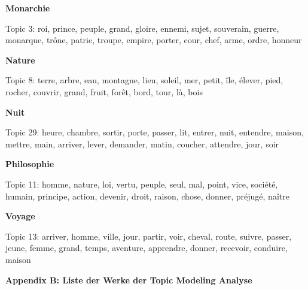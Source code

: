 \documentclass[
  12pt,
  letterpaper,
  DIV=11,
  numbers=noendperiod]{scrreprt}
\begin{document}
\textbf{Monarchie}

Topic 3: roi, prince, peuple, grand, gloire, ennemi, sujet, souverain,
guerre, monarque, trône, patrie, troupe, empire, porter, cour, chef,
arme, ordre, honneur

\textbf{Nature}

Topic 8: terre, arbre, eau, montagne, lieu, soleil, mer, petit, île,
élever, pied, rocher, couvrir, grand, fruit, forêt, bord, tour, là, bois

\textbf{Nuit}

Topic 29: heure, chambre, sortir, porte, passer, lit, entrer, nuit,
entendre, maison, mettre, main, arriver, lever, demander, matin,
coucher, attendre, jour, soir

\textbf{Philosophie}

Topic 11: homme, nature, loi, vertu, peuple, seul, mal, point, vice,
société, humain, principe, action, devenir, droit, raison, chose,
donner, préjugé, naître

\textbf{Voyage}

Topic 13: arriver, homme, ville, jour, partir, voir, cheval, route,
suivre, passer, jeune, femme, grand, temps, aventure, apprendre, donner,
recevoir, conduire, maison

\textbf{Appendix B: Liste der Werke der Topic Modeling Analyse}
\end{document}

